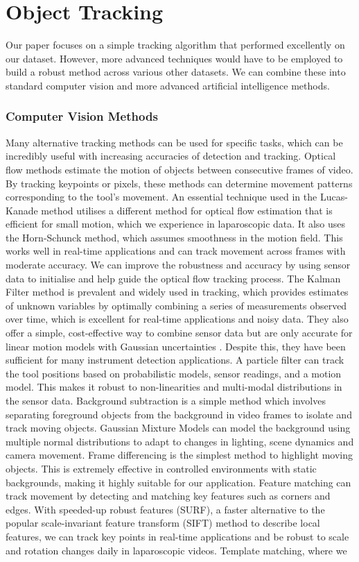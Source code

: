 \section{Object Tracking}

Our paper focuses on a simple tracking algorithm that performed excellently on our dataset. However, more advanced techniques would have to be employed to build a robust method across various other datasets. We can combine these into standard computer vision and more advanced artificial intelligence methods.

\subsubsection{Computer Vision Methods}

Many alternative tracking methods can be used for specific tasks, which can be incredibly useful with increasing accuracies of detection and tracking. Optical flow methods estimate the motion of objects between consecutive frames of video. By tracking keypoints or pixels, these methods can determine movement patterns corresponding to the tool's movement. An essential technique used in the Lucas-Kanade method utilises a different method for optical flow estimation that is efficient for small motion, which we experience in laparoscopic data. It also uses the Horn-Schunck method, which assumes smoothness in the motion field. This works well in real-time applications and can track movement across frames with moderate accuracy. We can improve the robustness and accuracy by using sensor data to initialise and help guide the optical flow tracking process. The Kalman Filter method is prevalent and widely used in tracking, which provides estimates of unknown variables by optimally combining a series of measurements observed over time, which is excellent for real-time applications and noisy data. They also offer a simple, cost-effective way to combine sensor data but are only accurate for linear motion models with Gaussian uncertainties \cite{bouget_vision-based_2017}. Despite this, they have been sufficient for many instrument detection applications. A particle filter can track the tool positions based on probabilistic models, sensor readings, and a motion model. This makes it robust to non-linearities and multi-modal distributions in the sensor data. Background subtraction is a simple method which involves separating foreground objects from the background in video frames to isolate and track moving objects. Gaussian Mixture Models can model the background using multiple normal distributions to adapt to changes in lighting, scene dynamics and camera movement. Frame differencing is the simplest method to highlight moving objects. This is extremely effective in controlled environments with static backgrounds, making it highly suitable for our application. Feature matching can track movement by detecting and matching key features such as corners and edges. With speeded-up robust features (SURF), a faster alternative to the popular scale-invariant feature transform (SIFT) method to describe local features, we can track key points in real-time applications and be robust to scale and rotation changes daily in laparoscopic videos. Template matching, where we 